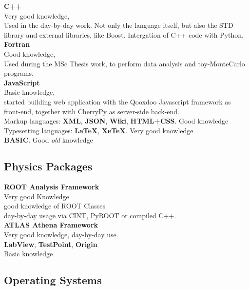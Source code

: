 \documentclass[10pt, a4paper]{article}
\begin{document}
\textbf{C++}\\ 
Very good knowledge,\\
      Used in the day-by-day work. Not only the language itself, but also the STD library and external libraries, like Boost.
      Intergation of C++ code with Python.\\

\textbf{Fortran}\\ 
Good knowledge,\\
      Used during the MSc Thesis work, to perform data analysis and toy-MonteCarlo programs.\\

\textbf{JavaScript}\\
 Basic knowledge,\\
      started building web application with the Qooxdoo Javascript framework as front-end, together with CherryPy as server-side back-end.\\

Markup languages: \textbf{XML}, \textbf{JSON}, \textbf{Wiki}, \textbf{HTML+CSS}. Good knowledge\\

Typesetting languages: \textbf{LaTeX}, \textbf{XeTeX}. Very good knowledge\\

\textbf{BASIC}. Good \textit{old} knowledge


	
\subsection{Physics Packages}

\textbf{ROOT Analysis Framework}\\ 
Very good Knowledge\\
     good knowledge of ROOT Classes\\
      day-by-day usage via CINT, PyROOT or compiled C++.\\

\textbf{ATLAS Athena Framework}\\
Very good knowledge, day-by-day use.\\

\textbf{LabView}, \textbf{TestPoint}, \textbf{Origin}\\ Basic knowledge\\
    
	
\subsection{Operating Systems}
\end{document}
